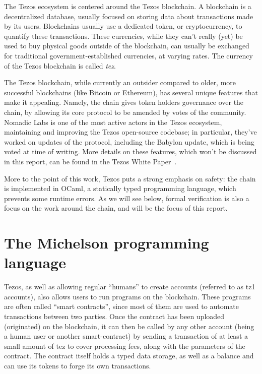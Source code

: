 \documentclass{report}
\begin{document}
The Tezos ecosystem is centered around the Tezos blockchain. A blockchain is a decentralized database, usually focused on storing data about transactions made by its users. Blockchains usually use a dedicated token, or cryptocurrency, to quantify these transactions. These currencies, while they can't really (yet) be used to buy physical goods outside of the blockchain, can usually be exchanged for traditional government-established currencies, at varying rates. The currency of the Tezos blockchain is called \emph{tez}.

The Tezos blockchain, while currently an outsider compared to older, more successful blockchains (like Bitcoin or Ethereum), has several unique features that make it appealing. Namely, the chain gives token holders governance over the chain, by allowing its core protocol to be amended by votes of the community. Nomadic Labs is one of the most active actors in the Tezos ecosystem, maintaining and improving the Tezos open-source codebase; in particular, they've worked on updates of the protocol, including the Babylon update, which is being voted at time of writing. More details on these features, which won't be discussed in this report, can be found in the Tezos White Paper~\cite{whitePaper}.

More to the point of this work, Tezos puts a strong emphasis on safety: the chain is implemented in OCaml, a statically typed programming language, which prevents some runtime errors. As we will see below, formal verification is also a focus on the work around the chain, and will be the focus of this report.

\section*{The Michelson programming language}

Tezos, as well as allowing regular ``humans'' to create accounts (referred to as tz1 accounts), also allows users to run programs on the blockchain. These programs are often called ``smart contracts'', since most of them are used to automate transactions between two parties. Once the contract has been uploaded (originated) on the blockchain, it can then be called by any other account (being a human user or another smart-contract) by sending a transaction of at least a small amount of tez to cover processing fees, along with the parameters of the contract. The contract itself holds a typed data storage, as well as a balance and can use its tokens to forge its own transactions.
\end{document}
